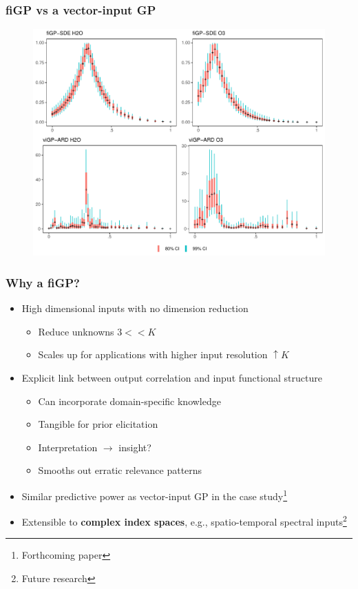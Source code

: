 \documentclass[aspectratio=169,t,xcolor=table]{beamer}
\begin{document}
\begin{frame}
  \frametitle{fiGP vs a vector-input GP}

  \begin{figure}
    \centering
    \includegraphics[height=.8\textheight]{weights-examples-pressure.pdf}
  \end{figure}
\end{frame}

\begin{frame}
  \frametitle{Why a fiGP?}
  \begin{itemize}
  \item[+]<1-> High dimensional inputs with no dimension reduction
    \begin{itemize}
    \item Reduce unknowns $3 << K$
    \item Scales up for applications with higher input resolution
      $\uparrow K$
    \end{itemize}
  \item[+]<2-> Explicit link between output correlation and
    input functional structure
    \begin{itemize}
    \item<2-> Can incorporate domain-specific knowledge
    \item<2-> Tangible for prior elicitation
    \item<2-> Interpretation $\to$ insight?
    \item<2-> Smooths out erratic relevance patterns
    \end{itemize}
  \item[+]<3-> Similar predictive power as vector-input
    GP in the case study\footnote{Forthcoming paper}
  \item[++]<4-> Extensible to \alert{\textbf{complex
index spaces}}, e.g., spatio-temporal spectral inputs\footnote{Future research}
  \end{itemize}
\end{frame}
\end{document}
